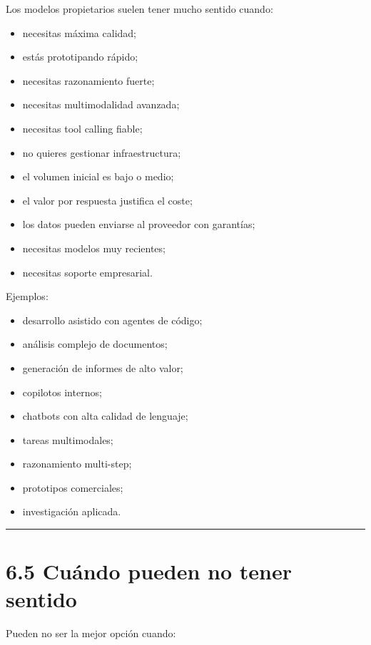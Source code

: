 Los modelos propietarios suelen tener mucho sentido cuando:

\begin{itemize}
\tightlist
\item
  necesitas máxima calidad;
\item
  estás prototipando rápido;
\item
  necesitas razonamiento fuerte;
\item
  necesitas multimodalidad avanzada;
\item
  necesitas tool calling fiable;
\item
  no quieres gestionar infraestructura;
\item
  el volumen inicial es bajo o medio;
\item
  el valor por respuesta justifica el coste;
\item
  los datos pueden enviarse al proveedor con garantías;
\item
  necesitas modelos muy recientes;
\item
  necesitas soporte empresarial.
\end{itemize}

Ejemplos:

\begin{itemize}
\tightlist
\item
  desarrollo asistido con agentes de código;
\item
  análisis complejo de documentos;
\item
  generación de informes de alto valor;
\item
  copilotos internos;
\item
  chatbots con alta calidad de lenguaje;
\item
  tareas multimodales;
\item
  razonamiento multi-step;
\item
  prototipos comerciales;
\item
  investigación aplicada.
\end{itemize}

\begin{center}\rule{0.5\linewidth}{0.5pt}\end{center}

\section{6.5 Cuándo pueden no tener
sentido}\label{cuuxe1ndo-pueden-no-tener-sentido}

Pueden no ser la mejor opción cuando:

